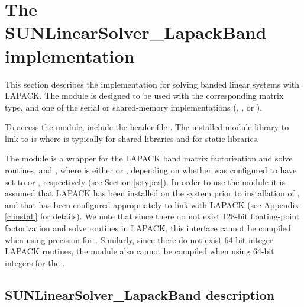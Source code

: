 \section{The SUNLinearSolver\_LapackBand implementation}
\label{ss:sunlinsol_lapband}

This section describes the {\sunlinsol} implementation for solving banded linear
systems with LAPACK. The {\sunlinsollapband} module is designed to be used with the
corresponding {\sunmatband} matrix type, and one of the serial or
shared-memory {\nvector} implementations ({\nvecs}, {\nvecopenmp}, or
{\nvecpthreads}).

To access the {\sunlinsollapband} module, include the header file \newline
{}. The installed module library to link
to is \newline
{} where 
is typically  for shared libraries and  for static libraries.

The {\sunlinsollapband} module is a {\sunlinsol} wrapper for
the LAPACK band matrix factorization and solve routines, 
and , where \id{*} is either  or , depending on
whether {\sundials} was configured to have  set to
 or , respectively (see Section \ref{s:types}).
In order to use the {\sunlinsollapband} module it is assumed
that LAPACK has been installed on the system prior to installation of
{\sundials}, and that {\sundials} has been configured appropriately to
link with LAPACK (see Appendix \ref{c:install} for details).  
We note that since there do not exist 128-bit floating-point
factorization and solve routines in LAPACK, this interface cannot be
compiled when using  precision for .
Similarly, since there do not exist 64-bit integer LAPACK routines,
the {\sunlinsollapband} module also cannot be compiled when using
64-bit integers for the . {\warn}


\subsection{SUNLinearSolver\_LapackBand description}
\label{ss:sunlinsol_lapband_description}

